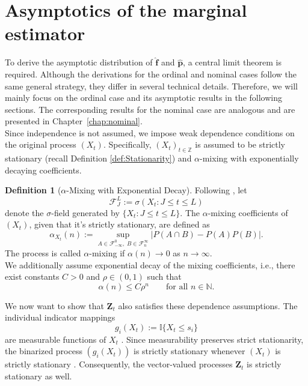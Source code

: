 ﻿\documentclass[12pt,a4paper]{scrreprt}
\theoremstyle{definition}
\newtheorem{definition}[theorem]{Definition}
\begin{document}
\section{Asymptotics of the marginal estimator}\label{sec:asymp_marg}
To derive the asymptotic distribution of $\hat{\boldsymbol{f}}$ and
$\hat{\boldsymbol{p}}$, a central limit theorem is
required. Although the derivations for the ordinal and nominal cases follow the same general strategy, 
they differ in several technical details. Therefore, we will mainly focus on the ordinal case and its 
asymptotic results in the following sections. The corresponding results for the nominal case are analogous 
and are presented in Chapter~\ref{chap:nominal}. \\ 
Since independence is not assumed, we impose weak dependence
conditions on the original process $(X_t)$.
Specifically, $(X_t)_{t \in \mathbb{Z}}$ is assumed to be strictly
stationary (recall Definition \ref{def:Stationarity}) and $\alpha$-mixing with exponentially decaying coefficients.\\
\begin{definition}[$\alpha$-Mixing with Exponential Decay]\label{def:mixing}
Following \citet[Section 2.1.]{bradley_2005}, let
\[
\mathcal{F}_J^L := \sigma(X_t : J \le t \le L)
\]
denote the $\sigma$-field generated by $\{X_t : J \le t \le L\}$.
The $\alpha$-mixing coefficients of $(X_t)$, given that it's strictly stationary, are defined as
\[
\alpha_{X_t}(n)
:= \sup_{A \in \mathcal{F}_{-\infty}^0,\; B \in \mathcal{F}_{n}^{\infty}}
\bigl| P(A \cap B) - P(A)P(B) \bigr|.
\]
The process is called $\alpha$-mixing if $\alpha(n) \to 0$ as $n \to \infty$.\\
We additionally assume exponential decay of the mixing coefficients,
i.e., there exist constants $C > 0$ and $\rho \in (0,1)$ such that
\begin{equation*}\label{eq:exp_mixing}
\alpha(n) \le C \rho^n \qquad \text{for all } n \in \mathbb{N}.
\end{equation*}
\end{definition}
\noindent
We now want to show that $\boldsymbol{Z}_t$ also satisfies these dependence assumptions. The individual indicator mappings
\[
g_i(X_t) := \mathbb{I}\{X_t \le s_i\}
\]
are measurable functions of $X_t$ \citep[p. 36]{klenke2005}.
Since measurability preserves strict stationarity, the binarized process
$(g_i(X_t))$ is strictly stationary whenever $(X_t)$ is
strictly stationary \citep[p. 157]{kallenberg_2021}.
Consequently, the vector-valued processes $\boldsymbol{Z}_t$ is strictly stationary as well.\\
\end{document}
